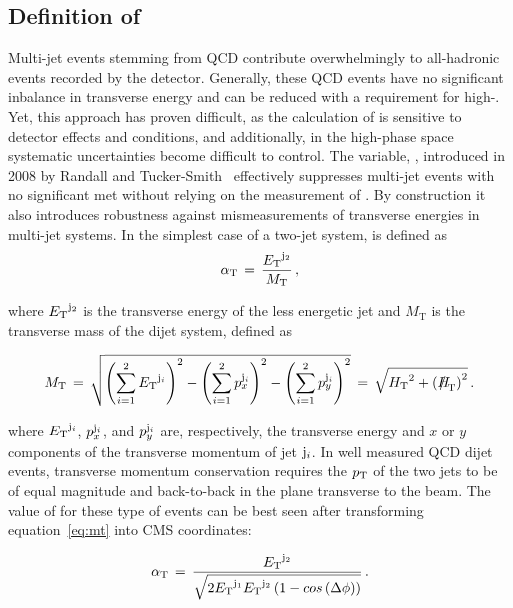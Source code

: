 \clearpage
\subsection{Definition of \texorpdfstring{\alphat}{AlphaT}\label{sec:alphat}}

Multi-jet events stemming from QCD contribute overwhelmingly to
all-hadronic events recorded by the detector. Generally, these QCD events
have no significant inbalance in transverse energy and can 
be reduced with a requirement for high-\met. Yet, this approach has proven difficult, 
as the calculation of \met is sensitive to detector effects and conditions, 
and additionally, in the high-\met phase space systematic uncertainties become difficult
to control. The variable, \alphat, introduced in 2008 by Randall and 
Tucker-Smith~\cite{Randall:2008rw} effectively suppresses multi-jet 
events with no significant met without relying on the measurement
of \met. By construction it also introduces robustness against mismeasurements 
of transverse energies in multi-jet systems.  In the simplest case of a two-jet system,
\alphat is defined as
\begin{equation}
\label{eq:alphat}
\alpha_{\text{T}}\, =\, \frac{{E_{\text T}}^{{\rm j}_2}}{M_\text{T}} \, ,
\end{equation}

where ${E_{\text T}}^{\rm j_2}$ is the transverse energy of the less energetic
jet and $M_\text{T}$ is the transverse mass of the dijet system,
defined as

\begin{equation}
  \label{eq:mt}
  M_\text{T}\, = \,\sqrt{ \left( \sum_{i=1}^2 \Et^{{\rm j}_i}
    \right)^2 - \left( \sum_{i=1}^2 p_x^{{\rm j}_i} \right)^2 - \left(
      \sum_{i=1}^2 p_y^{{\rm j}_i} \right)^2} \, = \,\sqrt{\scalht^2 + \left(\mht\right)^2} \,  .
\end{equation}

where ${E_{\text T}}^{{\rm j}_i}$, $p_x^{{\rm j}_i}$, and $p_y^{{\rm j}_i}$ are,
respectively, the transverse energy and $x$ or $y$ components of the
transverse momentum of jet ${\rm j}_i$. In well measured QCD dijet events, 
transverse momentum conservation requires the $p_{\mathrm{T}}$ of the two jets to be 
of equal magnitude and back-to-back in the plane transverse to the beam.
The value of \alphat for these type of events can be best seen
after transforming equation~\ref{eq:mt} into CMS coordinates:

\begin{equation}
  \label{eq:mt-polar}
  \alpha_{\text{T}}\, = \,\frac{{E_{\text T}}^{{\rm j}_2}}{\sqrt{2{E_{\text T}}^{{\rm j}_1}
   {E_{\text T}}^{{\rm j}_2} \left(1-cos\left(\Delta\phi\right)\right)}}\, .
\end{equation}

